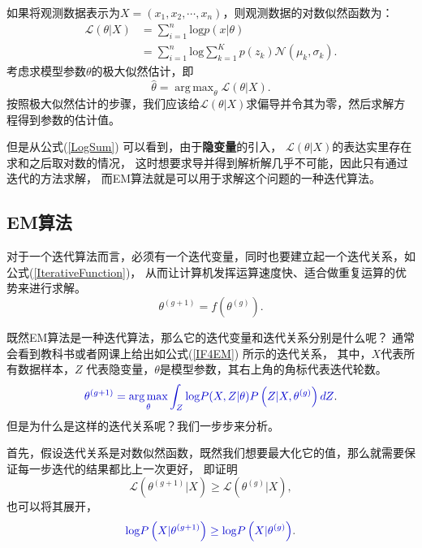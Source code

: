 \documentclass[UTF8]{ctexart}
\DeclareMathOperator*{\argmax}{arg\,max}
\begin{document}
如果将观测数据表示为$X=(x_1, x_2, \cdots, x_n)$，则观测数据的对数似然函数为：
\begin{equation}\label{LogSum}
  \begin{split}
    \mathcal{L}(\theta|X) &= \sum_{i=1}^{n}\mathrm{log}p(x|\theta)\\
    &= \sum_{i=1}^{n}\mathrm{log}\sum_{k=1}^{K}p(z_k) \mathcal{N}(\mu_k, \sigma_k).
  \end{split}
\end{equation}
考虑求模型参数$\theta$的极大似然估计，即
\begin{equation}\label{MaxLLH}
  \hat\theta = \argmax_{\theta}\mathcal{L}(\theta|X).
\end{equation}
按照极大似然估计的步骤，我们应该给$\mathcal{L}(\theta|X)$求偏导并令其为零，然后求解方程得到参数的估计值。

但是从公式(\ref{LogSum}) 可以看到，由于\textbf{隐变量}的引入，
$\mathcal{L}(\theta|X)$的表达实里存在求和之后取对数的情况，
这时想要求导并得到解析解几乎不可能，因此只有通过迭代的方法求解，
而EM算法就是可以用于求解这个问题的一种迭代算法。

\subsection{EM算法}

对于一个迭代算法而言，必须有一个迭代变量，同时也要建立起一个迭代关系，如公式(\ref{IterativeFunction})，
从而让计算机发挥运算速度快、适合做重复运算的优势来进行求解。
\begin{equation}\label{IterativeFunction}
  \theta^{(g+1)} = f \left (\theta^{(g)} \right).
\end{equation}

既然EM算法是一种迭代算法，那么它的迭代变量和迭代关系分别是什么呢？
通常会看到教科书或者网课上给出如公式(\ref{IF4EM}) 所示的迭代关系，
其中，$X$代表所有数据样本，$Z$ 代表隐变量，$\theta$是模型参数，其右上角的角标代表迭代轮数。
\begin{equation}\label{IF4EM}
  \textcolor[rgb]{0.0,0.0,0.8}{\theta^{(g+1)} = \argmax_{\theta} \int_{Z}\mathrm{log}P (X, Z | \theta) P \left(Z|X, \theta^{(g)} \right)dZ}.
\end{equation}
但是为什么是这样的迭代关系呢？我们一步步来分析。

首先，假设迭代关系是对数似然函数，既然我们想要最大化它的值，那么就需要保证每一步迭代的结果都比上一次更好，
即证明
\begin{equation}
  \mathcal{L} \left(\theta^{(g+1)}|X \right) \ge \mathcal{L} \left(\theta^{(g)}|X \right),
\end{equation}
也可以将其展开，
\begin{equation}\label{EMCondition}
  \textcolor[rgb]{0.0,0.0,0.8}{\mathrm{log}P \left(X|\theta^{(g+1)} \right) \ge \mathrm{log} P \left(X|\theta^{(g)}\right)}.
\end{equation}
\end{document}
